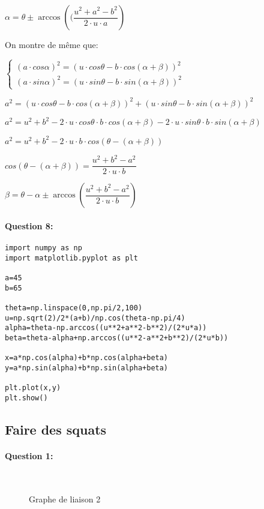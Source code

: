 $\alpha=\theta\pm\arccos\left((\dfrac{u^2+a^2-b^2}{2\cdot u\cdot a}\right)$

On montre de même que:

$\left\{\begin{array}{l}
(a\cdot cos\alpha)^2=(u\cdot cos\theta-b\cdot cos(\alpha+\beta))^2\\
(a\cdot sin\alpha)^2=(u\cdot sin\theta-b\cdot sin(\alpha+\beta))^2
\end{array}\right.$

$a^2=(u\cdot cos\theta-b\cdot cos(\alpha+\beta))^2+(u\cdot sin\theta-b\cdot sin(\alpha+\beta))^2$

$a^2=u^2+b^2-2\cdot u\cdot cos\theta\cdot b\cdot cos(\alpha+\beta)-2\cdot u\cdot sin\theta\cdot b\cdot sin(\alpha+\beta)$

$a^2=u^2+b^2-2\cdot u\cdot b\cdot cos(\theta-(\alpha+\beta))$

$cos(\theta-(\alpha+\beta))=\dfrac{u^2+b^2-a^2}{2\cdot u\cdot b}$


$\beta=\theta-\alpha\pm\arccos\left(\dfrac{u^2+b^2-a^2}{2\cdot u\cdot b}\right)$

\paragraph{Question 8:}

\begin{verbatim}
import numpy as np
import matplotlib.pyplot as plt

a=45
b=65

theta=np.linspace(0,np.pi/2,100)
u=np.sqrt(2)/2*(a+b)/np.cos(theta-np.pi/4)
alpha=theta-np.arccos((u**2+a**2-b**2)/(2*u*a))
beta=theta-alpha+np.arccos((u**2-a**2+b**2)/(2*u*b))

x=a*np.cos(alpha)+b*np.cos(alpha+beta)
y=a*np.sin(alpha)+b*np.sin(alpha+beta)

plt.plot(x,y)
plt.show()
\end{verbatim}

\subsection{Faire des squats}

\paragraph{Question 1:} ~\ \\

\begin{figure}[h!]
\begin{center}
  \resizebox{0.7\textwidth}{!}{}
  \caption{\label{fig07} Graphe de liaison 2}
\end{center}
\end{figure}

